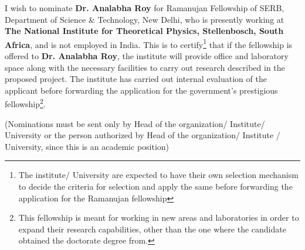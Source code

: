 \documentclass[a4paper,11pt,color]{article}
\newenvironment{list1}{
  \begin{list}{\ding{113}}{%
      \setlength{\itemsep}{0in}
      \setlength{\parsep}{0in} \setlength{\parskip}{0in}
      \setlength{\topsep}{0in} \setlength{\partopsep}{0in} 
      \setlength{\leftmargin}{0.17in}}}{\end{list}}
\begin{document}
I wish to nominate {\bf Dr. Analabha Roy} for Ramanujan Fellowship of SERB, Department of Science \& Technology, New Delhi, who is presently working at {\bf The National Institute for Theoretical Physics, Stellenbosch, South Africa}, and is not employed in India. This is to certify\footnote{The institute/ University are expected to have their own selection mechanism to decide the criteria for selection and apply the same before forwarding the
application for the Ramanujan fellowship} that if the fellowship is offered to {\bf Dr. Analabha Roy}, the institute will provide office and laboratory space along with the necessary facilities to carry out research described in the proposed project. The institute has carried out internal evaluation of the applicant before forwarding the application for the government's prestigious fellowship\footnote{This fellowship is meant for working in new areas and laboratories in order to expand their research capabilities, other than the one where the candidate obtained the doctorate degree from.}.\\

\vspace{1.5in}
(Nominations must be sent only by Head of the organization/ Institute/ University or
the person authorized by Head of the organization/ Institute / University, since this is
an academic position)
\end{document}
